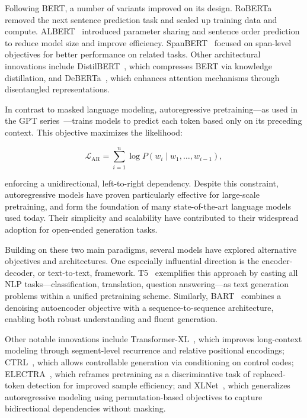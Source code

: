 Following BERT, a number of variants improved on its design. RoBERTa~\citep{liu2019roberta} removed the next sentence prediction task and scaled up training data and compute. ALBERT~\citep{lan2019albert} introduced parameter sharing and sentence order prediction to reduce model size and improve efficiency. SpanBERT~\citep{joshi2020spanbert} focused on span-level objectives for better performance on related tasks. Other architectural innovations include DistilBERT~\citep{sanh2019distilbert}, which compresses BERT via knowledge distillation, and DeBERTa~\citep{he2021deberta}, which enhances attention mechanisms through disentangled representations.

In contrast to masked language modeling, autoregressive pretraining—as used in the GPT series~\citep{radford2018gpt1, radford2019gpt2, brown2020gpt3}—trains models to predict each token based only on its preceding context. This objective maximizes the likelihood:

\begin{equation}
\mathcal{L}_{\text{AR}} = \sum_{i=1}^n \log P(w_i \mid w_1, \ldots, w_{i-1}),
\end{equation}

enforcing a unidirectional, left-to-right dependency. Despite this constraint, autoregressive models have proven particularly effective for large-scale pretraining, and form the foundation of many state-of-the-art language models used today. Their simplicity and scalability have contributed to their widespread adoption for open-ended generation tasks.

Building on these two main paradigms, several models have explored alternative objectives and architectures. One especially influential direction is the encoder-decoder, or text-to-text, framework. T5~\citep{raffel2020t5} exemplifies this approach by casting all NLP tasks—classification, translation, question answering—as text generation problems within a unified pretraining scheme. Similarly, BART~\citep{lewis2020bart} combines a denoising autoencoder objective with a sequence-to-sequence architecture, enabling both robust understanding and fluent generation.

Other notable innovations include Transformer-XL~\citep{dai2019transformer}, which improves long-context modeling through segment-level recurrence and relative positional encodings; CTRL~\citep{keskar2019ctrl}, which allows controllable generation via conditioning on control codes; ELECTRA~\citep{clark2020electra}, which reframes pretraining as a discriminative task of replaced-token detection for improved sample efficiency; and XLNet~\citep{yang2019xlnet}, which generalizes autoregressive modeling using permutation-based objectives to capture bidirectional dependencies without masking.

